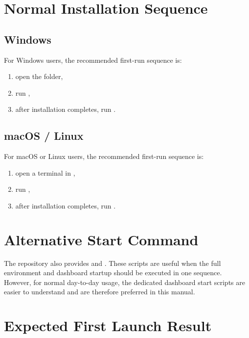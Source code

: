 \section{Normal Installation Sequence}

\subsection{Windows}

For Windows users, the recommended first-run sequence is:

\begin{enumerate}
    \item open the  folder,
    \item run ,
    \item after installation completes, run .
\end{enumerate}

\subsection{macOS / Linux}

For macOS or Linux users, the recommended first-run sequence is:

\begin{enumerate}
    \item open a terminal in ,
    \item run ,
    \item after installation completes, run .
\end{enumerate}

\section{Alternative Start Command}

The repository also provides  and . These scripts are useful when the full environment and dashboard startup should be executed in one sequence. However, for normal day-to-day usage, the dedicated dashboard start scripts are easier to understand and are therefore preferred in this manual.

\section{Expected First Launch Result}

